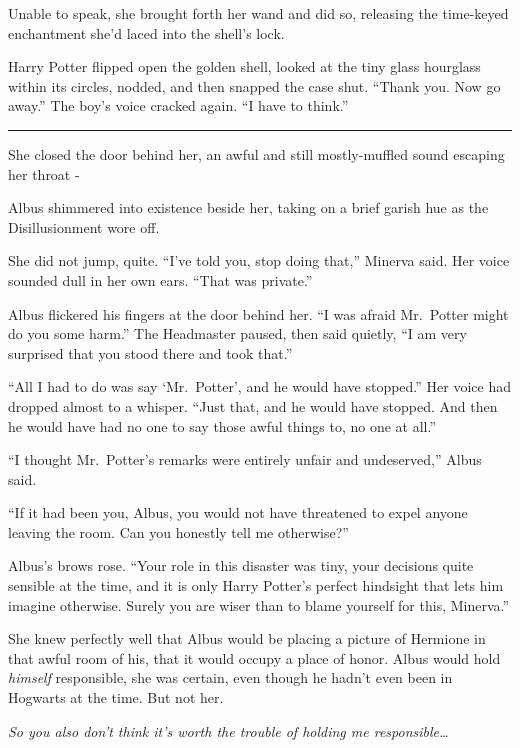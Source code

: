 Unable to speak, she brought forth her wand and did so, releasing the
time-keyed enchantment she'd laced into the shell's lock.

Harry Potter flipped open the golden shell, looked at the tiny glass
hourglass within its circles, nodded, and then snapped the case shut.
``Thank you. Now go away.'' The boy's voice cracked again. ``I have to
think.''

\begin{center}\rule{3in}{0.4pt}\end{center}

She closed the door behind her, an awful and still mostly-muffled sound
escaping her throat -

Albus shimmered into existence beside her, taking on a brief garish hue
as the Disillusionment wore off.

She did not jump, quite. ``I've told you, stop doing that,'' Minerva
said. Her voice sounded dull in her own ears. ``That was private.''

Albus flickered his fingers at the door behind her. ``I was afraid
Mr.~Potter might do you some harm.'' The Headmaster paused, then said
quietly, ``I am very surprised that you stood there and took that.''

``All I had to do was say `Mr.~Potter', and he would have stopped.'' Her
voice had dropped almost to a whisper. ``Just that, and he would have
stopped. And then he would have had no one to say those awful things to,
no one at all.''

``I thought Mr.~Potter's remarks were entirely unfair and undeserved,''
Albus said.

``If it had been you, Albus, you would not have threatened to expel
anyone leaving the room. Can you honestly tell me otherwise?''

Albus's brows rose. ``Your role in this disaster was tiny, your
decisions quite sensible at the time, and it is only Harry Potter's
perfect hindsight that lets him imagine otherwise. Surely you are wiser
than to blame yourself for this, Minerva.''

She knew perfectly well that Albus would be placing a picture of
Hermione in that awful room of his, that it would occupy a place of
honor. Albus would hold \emph{himself} responsible, she was certain,
even though he hadn't even been in Hogwarts at the time. But not her.

\emph{So you also don't think it's worth the trouble of holding me
responsible\ldots{}}


